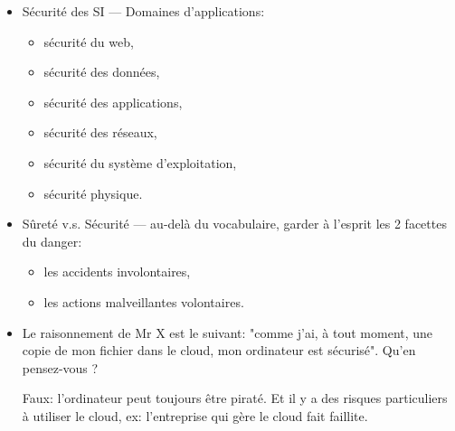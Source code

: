\documentclass[a4paper]{article}
\begin{document}
\begin{itemize}
\item Sécurité des SI --- Domaines d'applications:
\begin{itemize}
    \item sécurité du web,
    \item sécurité des données,
    \item sécurité des applications,
    \item sécurité des réseaux,
    \item sécurité du système d'exploitation,
    \item sécurité physique.
\end{itemize}





\item Sûreté v.s. Sécurité --- au-delà du vocabulaire, garder à l'esprit les 2 facettes du danger:
\begin{itemize}
    \item les accidents involontaires,
    \item les actions malveillantes volontaires.
\end{itemize}





\item Le raisonnement de Mr X est le suivant: "comme j’ai, à tout moment, une copie de mon fichier dans le cloud, mon ordinateur est sécurisé". Qu'en pensez-vous ?
\begin{example}
    Faux: l'ordinateur peut toujours être piraté. Et il y a des risques particuliers à utiliser le cloud, ex: l'entreprise qui gère le cloud fait faillite.
\end{example}










\newpage











\end{itemize}
\end{document}
